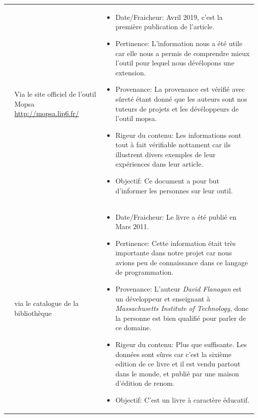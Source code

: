 \documentclass[french]{article}
\begin{document}
\begin{tabular}{ |p{1.5cm}||p{6cm}|p{8cm}|  }
 \cite{caires_abstract_2019}&   Via le site officiel de l'outil Mopsa \url{http://mopsa.lip6.fr/} &  \begin{itemize}
\item Date/Fraicheur:  Avril 2019, c'est la première publication de l'article. 
\item Pertinence: L'information nous a été utile car elle nous a permis de comprendre mieux l'outil pour lequel nous dévélopons une extension. 
\item Provenance: La provenance est vérifié avec sûreté étant donné que les auteurs sont nos tuteurs de projets et les dévéloppeurs de l'outil mopsa. 
\item Rigeur du contenu: Les informations sont tout à fait vérifiable nottament car ils illustrent divers exemples de leur expériences dans leur article. 
\item Objectif: Ce document a pour but d'informer les personnes sur leur outil. 
\newline
\end{itemize}  \\
 \cite{JavaScriptBook} & via le catalogue de la bibliothèque &  \begin{itemize}
\item Date/Fraicheur:  Le livre a été publié en Mars 2011. 
\item Pertinence: Cette information était très importante dans notre projet car nous avions peu de connaissance dans ce langage de programmation.
\item Provenance: L'auteur \emph{David Flanagan} est un développeur et enseignant à \emph{Massachusetts Institute of Technology}, donc la personne est bien qualifié pour parler de ce domaine. 
\item Rigeur du contenu: Plus que suffisante. Les données sont sûres car c'est la sixième edition de ce livre et il est vendu partout dans le monde, et publié par une maison d'édition de renom. 
\item Objectif: C'est un livre à caractère éducatif. 
\newline
\end{itemize}\\
 \hline
\end{tabular}


%  


\end{document}
